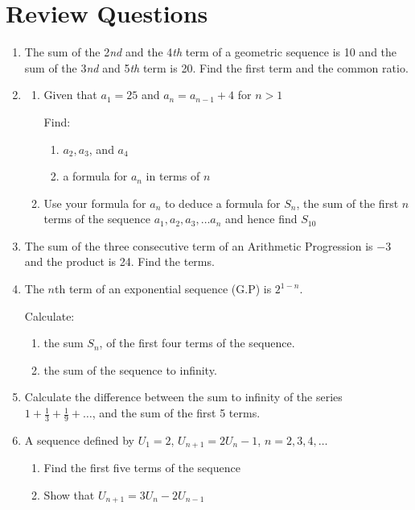 \section*{Review Questions}

\begin{enumerate}
\item The sum of the 2\textit{nd} and the 4\textit{th} term of a geometric sequence is 10 and
the sum of the 3\textit{nd} and 5\textit{th} term is 20. Find the first term and the common
ratio.

\item
\begin{enumerate}
  \item[a.] Given that $a_1 = 25$ and $a_n = a_{n-1} + 4$ for $n > 1$

  Find:
  \begin{enumerate}
    \item[(i)] $a_2, a_3$, and $a_4$
    \item[(ii)] a formula for $a_n$ in terms of $n$
  \end{enumerate}
  \item[b.] Use your formula for $a_n$ to deduce a formula for $S_n$, the sum of the
  first $n$ terms of the sequence $a_1, a_2, a_3, \ldots a_n$ and hence find $S_{10}$
\end{enumerate}

\item The sum of the three consecutive term of an Arithmetic Progression is $-3$
and the product is 24. Find the terms.

\item The $n$th term of an exponential sequence (G.P) is $2^{1-n}$.

Calculate:
\begin{enumerate}
  \item[a.] the sum $S_n$, of the first four terms of the sequence.
  \item[b.] the sum of the sequence to infinity.
\end{enumerate}

\item Calculate the difference between the sum to infinity of the series
$1 + \frac{1}{3} + \frac{1}{9} + \ldots$, and the sum of the first 5 terms.

\item A sequence defined by $U_1 = 2$, $U_{n+1} = 2U_n - 1$, $n = 2, 3, 4, \ldots$
\begin{enumerate}
  \item[a.] Find the first five terms of the sequence
  \item[b.] Show that $U_{n+1} = 3U_n - 2U_{n-1}$
\end{enumerate}


\end{enumerate}
